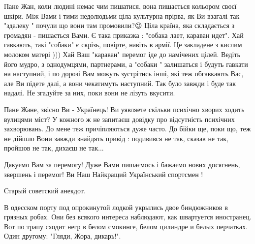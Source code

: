 \begin{itemize}
Пане Жан, коли людині немає чим пишатися, вона пишається кольором своєї шкіри.
Між Вами і тими недолюдьми ціла культурна прірва, як Ви взагалі так "здалеку "
почули що вони там промовили?😉 Ціла країна, яка складається з громадян -
пишається Вами. Є така приказка : "собака лает, караван идет". Хай гавкають,
такі "собаки" є скрізь, повірте, навіть в армії. Це закладене з кислим молоком
матері ))) Хай Ваш "караван" перемог іде до намічених цілей. Ведіть його мудро,
з однодумцями, партнерами, а "собаки " залишаться і будуть гавкати на
наступний, і по дорозі Вам можуть зустрітись інші, які теж обгавкають Вас, але
Ви підете далі, а вони чекатимуть наступний. Так було завжди і буде так надалі.
Не згадуйте за них, поки вони не лізуть вкусити.



Пане Жане, звісно Ви - Українець! Ви уявляете скільки психічно хворих ходить
вулицями міст? У кожного ж не запитаєш довідку про відсутність психічних
захворювань. До мене теж причіпляються дуже часто. До бійки ще, поки що, теж не
дійшло Вони завжди знайдять привід : подивився не так, сказав не так, пройшов
не так, дихаєш не так...

Дякуємо Вам за перемогу! Дуже Вами пишаємось і бажаємо нових досягнень,
звершень і перемог! Ви Наш Найкращий Український спортсмен !

 
Старый советский анекдот.

В одесском порту под опрокинутой лодкой укрылись двое биндюжников в грязных
робах. Они без всякого интереса наблюдают, как швартуется иностранец. Вот по
трапу сходит негр в белом смокинге, белом цилиндре и белых перчатках. Один
другому: "Гляди, Жора, дикарь!".


 


\end{itemize}
